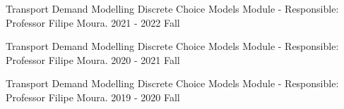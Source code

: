 

\begin{cvteachings}

  \cvteaching
    {Transport Demand Modelling} %
    {Discrete Choice Models Module - Responsible: Professor Filipe Moura.} %
    {} %
    {2021 - 2022 Fall} %

  \cvteaching
    {Transport Demand Modelling} %
    {Discrete Choice Models Module - Responsible: Professor Filipe Moura.} %
    {} %
    {2020 - 2021 Fall} %

  \cvteaching
    {Transport Demand Modelling} %
    {Discrete Choice Models Module - Responsible: Professor Filipe Moura.} %
    {} %
    {2019 - 2020 Fall} %


\end{cvteachings}

